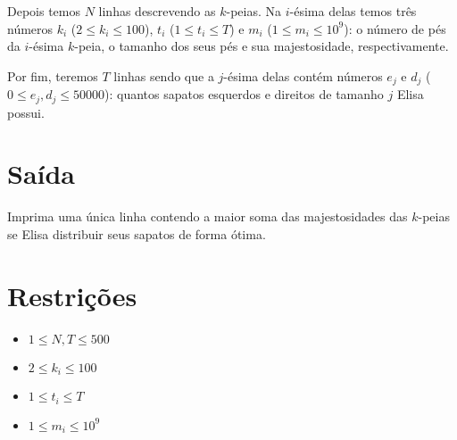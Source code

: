 Depois temos $N$ linhas descrevendo as $k$-peias. Na $i$-ésima delas temos três números $k_i$ ($2 \leq k_i \leq 100$), $t_i$ ($1 \leq t_i \leq T$) e $m_i$ ($1 \leq m_i \leq 10^9$): o número de pés da $i$-ésima $k$-peia, o tamanho dos seus pés e sua majestosidade, respectivamente. 

Por fim, teremos $T$ linhas sendo que a $j$-ésima delas contém números $e_j$ e $d_j$ ($0 \leq e_j, d_j \leq 50000$): quantos sapatos esquerdos e direitos de tamanho $j$ Elisa possui.

%
%


\section*{Saída}

Imprima uma única linha contendo a maior soma das majestosidades das $k$-peias se Elisa distribuir seus sapatos de forma ótima.

\section*{Restrições}

\begin{itemize}
\item $ 1 \leq N, T \leq 500$
\item $2 \leq k_i \leq 100$
\item $1 \leq t_i \leq T$
\item $1 \leq m_i \leq 10^9$
\end{itemize}


\exemplo
